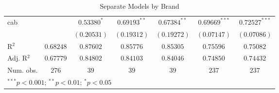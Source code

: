 \begin{table}
\begin{center}
\begin{footnotesize}
\begin{tabular}{l c c c c c c}
cab         &                  & $0.53380^{*}$   & $0.69193^{**}$   & $0.67384^{**}$   & $0.69669^{***}$  & $0.72527^{***}$  \\
            &                  & $(0.20531)$     & $(0.19312)$      & $(0.19272)$      & $(0.07147)$      & $(0.07086)$      \\
\hline
R$^2$       & $0.68248$        & $0.87602$       & $0.85776$        & $0.85305$        & $0.75596$        & $0.75082$        \\
Adj. R$^2$  & $0.67779$        & $0.84802$       & $0.84103$        & $0.84046$        & $0.74850$        & $0.74432$        \\
Num. obs.   & $276$            & $39$            & $39$             & $39$             & $237$            & $237$            \\
\hline
\multicolumn{7}{l}{\tiny{$^{***}p<0.001$; $^{**}p<0.01$; $^{*}p<0.05$}}
\end{tabular}
\end{footnotesize}
\caption{Separate Models by Brand}
\label{tab:reg_johndeere}
\end{center}
\end{table}
